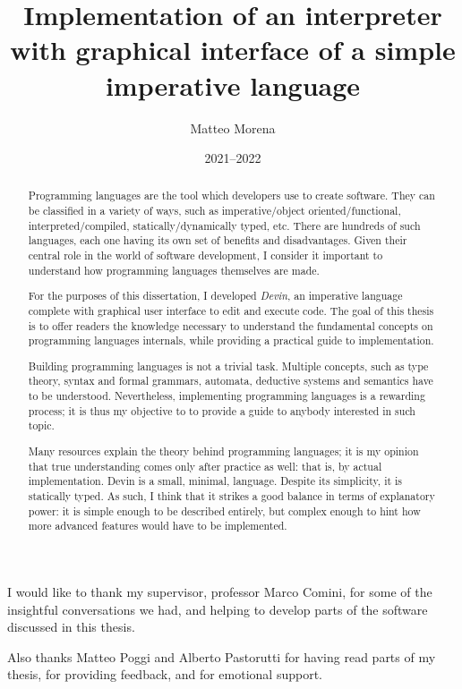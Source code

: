 \documentclass[UdineBachThesis,american,11pt]{PhdThesis}
\author{Matteo Morena}
\date{2021--2022}
\title{
  Implementation of an interpreter with graphical interface of a simple
  imperative language
}
\begin{document}
  \pagestyle{empty}

  \maketitle

  \cleardoublepage


  \begin{abstract}
    Programming languages are the tool which developers use to create software.
    They can be classified in a variety of ways, such as imperative/object
    oriented/functional, interpreted/compiled, statically/dynamically typed,
    etc. There are hundreds of such languages, each one having its own set of
    benefits and disadvantages. Given their central role in the world of
    software development, I consider it important to understand how programming
    languages themselves are made.

    For the purposes of this dissertation, I developed \emph{Devin}, an
    imperative language complete with graphical user interface to edit and
    execute code. The goal of this thesis is to offer readers the knowledge
    necessary to understand the fundamental concepts on programming languages
    internals, while providing a practical guide to implementation.

    Building programming languages is not a trivial task. Multiple concepts,
    such as type theory, syntax and formal grammars, automata, deductive systems
    and semantics have to be understood. Nevertheless, implementing programming
    languages is a rewarding process; it is thus my objective to to provide a
    guide to anybody interested in such topic.

    Many resources explain the theory behind programming languages; it is my
    opinion that true understanding comes only after practice as well: that is,
    by actual implementation. Devin is a small, minimal, language. Despite its
    simplicity, it is statically typed. As such, I think that it strikes a good
    balance in terms of explanatory power: it is simple enough to be described
    entirely, but complex enough to hint how more advanced features would have
    to be implemented.
  \end{abstract}


  \begin{acknowledgments}
    I would like to thank my supervisor, professor Marco Comini, for some of the
    insightful conversations we had, and helping to develop parts of the
    software discussed in this thesis.

    Also thanks Matteo Poggi and Alberto Pastorutti for having read parts of my
    thesis, for providing feedback, and for emotional support.
  \end{acknowledgments}
\end{document}
